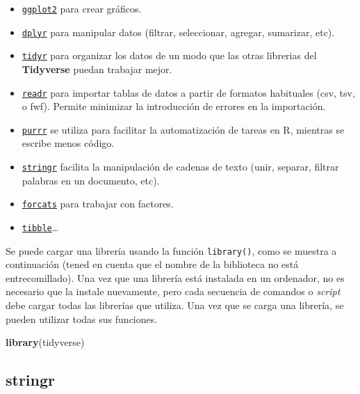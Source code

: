 \documentclass[
]{book}
\newenvironment{Shaded}{\begin{snugshade}}{\end{snugshade}}
\newcommand{\KeywordTok}[1]{\textcolor[rgb]{0.13,0.29,0.53}{\textbf{#1}}}
\newcommand{\NormalTok}[1]{#1}
\providecommand{\tightlist}{%
  \setlength{\itemsep}{0pt}\setlength{\parskip}{0pt}}
\begin{document}
\begin{itemize}
\tightlist
\item
  \href{https://ggplot2.tidyverse.org/}{\texttt{ggplot2}} para crear gráficos.
\item
  \href{https://dplyr.tidyverse.org/}{\texttt{dplyr}} para manipular datos (filtrar, seleccionar, agregar, sumarizar, etc).
\item
  \href{https://tidyr.tidyverse.org/}{\texttt{tidyr}} para organizar los datos de un modo que las otras librerias del \textbf{Tidyverse} puedan trabajar mejor.
\item
  \href{https://readr.tidyverse.org/}{\texttt{readr}} para importar tablas de datos a partir de formatos habituales (csv, tsv, o fwf). Permite minimizar la introducción de errores en la importación.
\item
  \href{https://purrr.tidyverse.org/}{\texttt{purrr}} se utiliza para facilitar la automatización de tareas en R, mientras se escribe menos código.
\item
  \href{https://stringr.tidyverse.org/}{\texttt{stringr}} facilita la manipulación de cadenas de texto (unir, separar, filtrar palabras en un documento, etc).
\item
  \href{https://forcats.tidyverse.org/}{\texttt{forcats}} para trabajar con factores.
\item
  \href{https://tibble.tidyverse.org/}{\texttt{tibble}}\ldots{}
\end{itemize}

Se puede cargar una librería usando la función \texttt{library()}, como se muestra a continuación (tened en cuenta que el nombre de la biblioteca no está entrecomillado). Una vez que una librería está instalada en un ordenador, no es necesario que la instale nuevamente, pero cada secuencia de comandos o \emph{script} debe cargar todas las librerías que utiliza. Una vez que se carga una librería, se pueden utilizar todas sus funciones.

\begin{Shaded}
\begin{Highlighting}[]
\KeywordTok{library}\NormalTok{(tidyverse)}
\end{Highlighting}
\end{Shaded}

\hypertarget{stringr}{%
\subsection{stringr}\label{stringr}}
\end{document}
